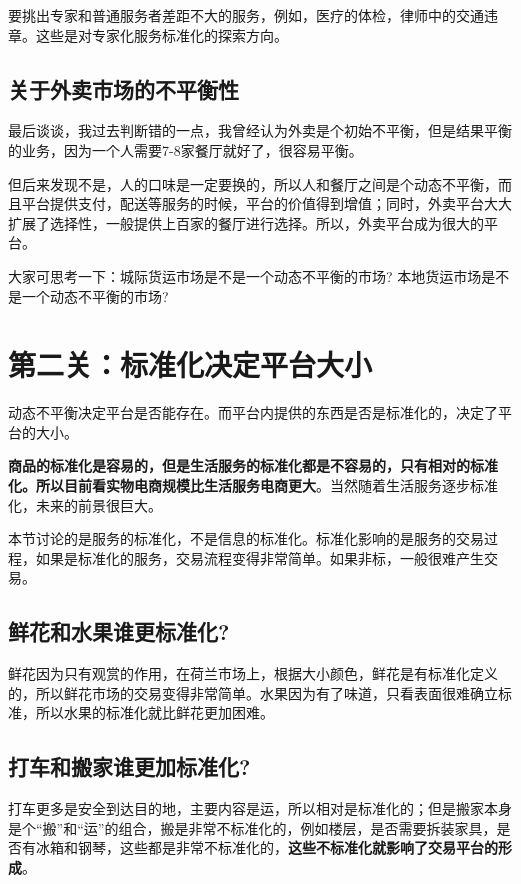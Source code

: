 \documentclass[12pt]{article}
\begin{document}
要挑出专家和普通服务者差距不大的服务，例如，医疗的体检，律师中的交通违章。这些是对专家化服务标准化的探索方向。

\subsection{关于外卖市场的不平衡性}

最后谈谈，我过去判断错的一点，我曾经认为外卖是个初始不平衡，但是结果平衡的业务，因为一个人需要7-8家餐厅就好了，很容易平衡。

但后来发现不是，人的口味是一定要换的，所以人和餐厅之间是个动态不平衡，而且平台提供支付，配送等服务的时候，平台的价值得到增值；同时，外卖平台大大扩展了选择性，一般提供上百家的餐厅进行选择。所以，外卖平台成为很大的平台。

大家可思考一下：城际货运市场是不是一个动态不平衡的市场? 本地货运市场是不是一个动态不平衡的市场?

\section{第二关：标准化决定平台大小}
动态不平衡决定平台是否能存在。而平台内提供的东西是否是标准化的，决定了平台的大小。

\textbf{商品的标准化是容易的，但是生活服务的标准化都是不容易的，只有相对的标准化。所以目前看实物电商规模比生活服务电商更大}。当然随着生活服务逐步标准化，未来的前景很巨大。

本节讨论的是服务的标准化，不是信息的标准化。标准化影响的是服务的交易过程，如果是标准化的服务，交易流程变得非常简单。如果非标，一般很难产生交易。

\subsection{鲜花和水果谁更标准化?}

鲜花因为只有观赏的作用，在荷兰市场上，根据大小颜色，鲜花是有标准化定义的，所以鲜花市场的交易变得非常简单。水果因为有了味道，只看表面很难确立标准，所以水果的标准化就比鲜花更加困难。

\subsection{打车和搬家谁更加标准化?}

打车更多是安全到达目的地，主要内容是运，所以相对是标准化的；但是搬家本身是个“搬”和“运”的组合，搬是非常不标准化的，例如楼层，是否需要拆装家具，是否有冰箱和钢琴，这些都是非常不标准化的，\textbf{这些不标准化就影响了交易平台的形成}。
\end{document}
